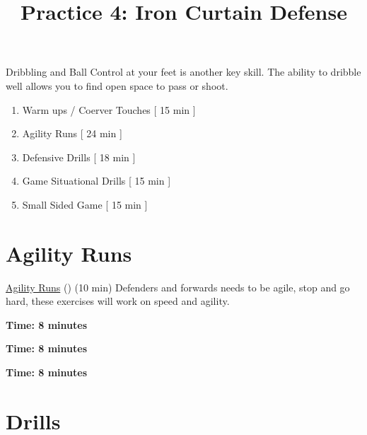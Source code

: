 \documentclass[10pt,letterpaper]{article}
\title{Practice 4: Iron Curtain Defense}
\author{}
\date{}
\newenvironment{agendablock}[1]{%
    \tcolorbox[beamer,%
    noparskip,breakable,
    colback=LightGray,colframe=DarkGray,%
    colbacklower=Gray!75!LightGray,%
    title=#1]}%
    {\endtcolorbox}
\begin{document}
\selectfont
\maketitle

\begin{agendablock}{Practice Activities}
    Dribbling and Ball Control at your feet is another key skill.  The ability to dribble well allows you to find open space to pass or shoot. 
    \begin{enumerate}
        \item Warm ups / Coerver Touches [ 15 min ]
        \item Agility Runs [ 24 min ]
        \item Defensive Drills [ 18 min ]
        \item Game Situational Drills [ 15 min ]
        \item Small Sided Game [ 15 min ]
    \end{enumerate}
\end{agendablock}



\clearpage



\section{Agility Runs}
\href{https://www.youtube.com/watch?v=3ew2m3m5f0M}{Agility Runs} () (10 min)
Defenders and forwards needs to be agile, stop and go hard, these exercises will work on speed and agility.

\textbf{Time: 8 minutes}


\textbf{Time: 8 minutes}


\textbf{Time: 8 minutes}


\clearpage

\section{Drills}
\end{document}
